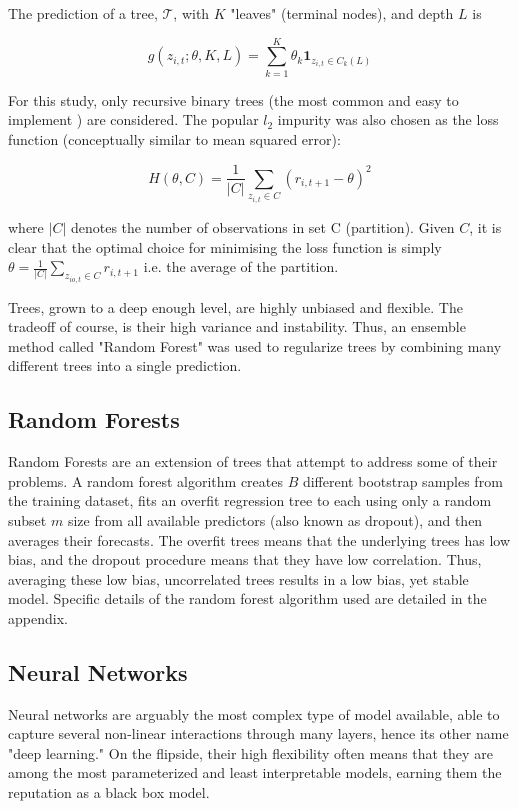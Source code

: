 \documentclass[man, a4paper, biblatex]{apa6}
\begin{document}
The prediction of a tree, $\mathcal{T}$, with $K$ "leaves" (terminal nodes), and depth $L$ is

\begin{equation}
	g(z_{i,t};\theta,K,L) = \sum_{k=1}^{K}\theta_k\textbf{1}_{z_{i,t}\in C_k(L)}
\end{equation}

For this study, only recursive binary trees (the most common and easy to implement ) are considered. The popular $l_2$ impurity was also chosen as the loss function (conceptually similar to mean squared error):

\begin{equation}
	H(\theta, C) = \frac{1}{|C|} \sum_{z_{i,t} \in C} (r_{i,t+1} - \theta)^2
\end{equation}

where $|C|$ denotes the number of observations in set C (partition). Given $C$, it is clear that the optimal choice for minimising the loss function is simply $\theta = \frac{1}{|C|} \sum_{z_{io,t}\in C}^{ }r_{i,t+1}$ i.e. the average of the partition.

Trees, grown to a deep enough level, are highly unbiased and flexible. The tradeoff of course, is their high variance and instability. Thus, an ensemble method called "Random Forest" was used to regularize trees by combining many different trees into a single prediction.

\subsection{Random Forests}
Random Forests are an extension of trees that attempt to address some of their problems. A random forest algorithm creates $B$ different bootstrap samples from the training dataset, fits an overfit regression tree to each using only a random subset $m$ size from all available predictors (also known as dropout), and then averages their forecasts. The overfit trees means that the underlying trees has low bias, and the dropout procedure means that they have low correlation. Thus, averaging these low bias, uncorrelated trees results in a low bias, yet stable model. Specific details of the random forest algorithm used are detailed in the appendix.

\subsection{Neural Networks}

Neural networks are arguably the most complex type of model available, able to capture several non-linear interactions through many layers, hence its other name "deep learning." On the flipside, their high flexibility often means that they are among the most parameterized and least interpretable models, earning them the reputation as a black box model.
\end{document}
